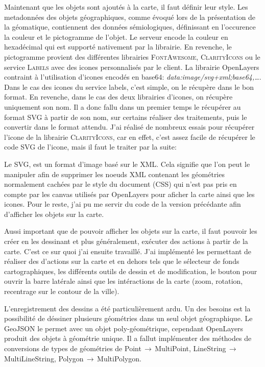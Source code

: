 \documentclass{rapportUHA40}
\begin{document}
Maintenant que les objets sont ajoutés à la carte, il faut définir leur style.
Les metadonnées des objets géographiques, comme évoqué lors de la présentation
de la géomatique, contiennent des données sémiologiques, définissant en
l'occurence la couleur et le pictogramme de l'objet. Le serveur encode la
couleur en hexadécimal qui est supporté nativement par la librairie. En
revenche, le pictogramme provient des différentes librairies
\textsc{FontAwesome}, \textsc{ClarityIcons} ou le service \textsc{Labels} avec
des icones personnalisés par le client. La librairie OpenLayers contraint à
l'utilisation d'icones encodés en base64:
\textit{data:image/svg+xml;base64,\ldots}. Dans le cas des icones du service
labels, c'est simple, on le récupère dans le bon format. En revenche, dans le
cas des deux librairies d'icones, on récupère uniquement son nom. Il a donc
fallu dans un premier temps le récupérer au format SVG à partir de son nom, sur
certains réaliser des traitements, puis le convertir dans le format attendu.
J'ai réalisé de nombreux essais pour récupérer l'icone de la librairie
\textsc{ClarityIcons}, car en effet, c'est assez facile de récupérer le code
SVG de l'icone, mais il faut le traiter par la suite:

Le SVG, est un format d'image basé sur le XML\@. Cela signifie que l'on peut le
manipuler afin de supprimer les noeuds XML contenant les géométries normalement
cachées par le style du document (CSS) qui n'est pas pris en compte par les
canvas utilisés par OpenLayers pour aficher la carte ainsi que les icones. Pour
le reste, j'ai pu me servir du code de la version précédante afin d'afficher
les objets sur la carte.

Aussi important que de pouvoir afficher les objets sur la carte, il faut
pouvoir les créer en les dessinant et plus généralement, exécuter des actions à
partir de la carte. C'est ce sur quoi j'ai ensuite travaillé. J'ai implémenté
les  \fg{} permettant de réaliser des d'actions sur la
carte et en dehors tels que le sélecteur de fonds cartographiques, les
différents outils de dessin et de modification, le bouton pour ouvrir la barre
latérale ainsi que les intéractions de la carte (zoom, rotation, recentrage sur
le contour de la ville).

L'enregistrement des dessins a été particulièrement ardu. Un des besoins est la
possibilité de déssiner plusieurs géométries dans un seul objet géographique.
Le GeoJSON le permet avec un objet poly-géométrique, cependant OpenLayers
produit des objets à géométrie unique. Il a fallut implémenter des méthodes de
conversions de types de géométries de Point$\,\to\,$MultiPoint,
LineString$\,\to\,$MultiLineString, Polygon$\,\to\,$MultiPolygon.
\end{document}
